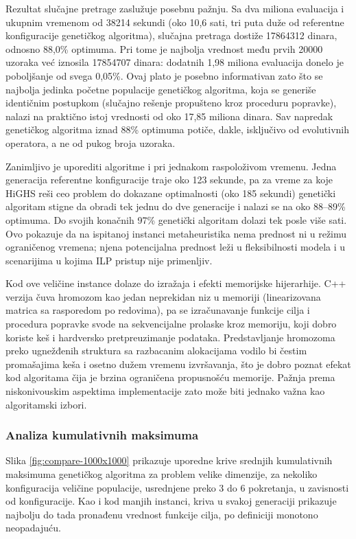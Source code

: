 \documentclass[12pt]{article}
\begin{document}
Rezultat slučajne pretrage zaslužuje posebnu pažnju. Sa dva miliona evaluacija i ukupnim vremenom od 38214 sekundi (oko 10,6 sati, tri puta duže od referentne konfiguracije genetičkog algoritma), slučajna pretraga dostiže 17864312 dinara, odnosno 88{,}0\% optimuma. Pri tome je najbolja vrednost među prvih 20000 uzoraka već iznosila 17854707 dinara: dodatnih 1,98 miliona evaluacija donelo je poboljšanje od svega 0,05\%. Ovaj plato je posebno informativan zato što se najbolja jedinka početne populacije genetičkog algoritma, koja se generiše identičnim postupkom (slučajno rešenje propušteno kroz proceduru popravke), nalazi na praktično istoj vrednosti od oko 17,85 miliona dinara. Sav napredak genetičkog algoritma iznad 88\% optimuma potiče, dakle, isključivo od evolutivnih operatora, a ne od pukog broja uzoraka.

Zanimljivo je uporediti algoritme i pri jednakom raspoloživom vremenu. Jedna generacija referentne konfiguracije traje oko 123 sekunde, pa za vreme za koje HiGHS reši ceo problem do dokazane optimalnosti (oko 185 sekundi) genetički algoritam stigne da obradi tek jednu do dve generacije i nalazi se na oko 88--89\% optimuma. Do svojih konačnih 97\% genetički algoritam dolazi tek posle više sati. Ovo pokazuje da na ispitanoj instanci metaheuristika nema prednost ni u režimu ograničenog vremena; njena potencijalna prednost leži u fleksibilnosti modela i u scenarijima u kojima ILP pristup nije primenljiv.

Kod ove veličine instance dolaze do izražaja i efekti memorijske hijerarhije. C++ verzija čuva hromozom kao jedan neprekidan niz u memoriji (linearizovana matrica sa rasporedom po redovima), pa se izračunavanje funkcije cilja i procedura popravke svode na sekvencijalne prolaske kroz memoriju, koji dobro koriste keš i hardversko pretpreuzimanje podataka. Predstavljanje hromozoma preko ugnežđenih struktura sa razbacanim alokacijama vodilo bi čestim promašajima keša i osetno dužem vremenu izvršavanja, što je dobro poznat efekat kod algoritama čija je brzina ograničena propusnošću memorije. Pažnja prema niskonivouskim aspektima implementacije zato može biti jednako važna kao algoritamski izbori.

\subsubsection{Analiza kumulativnih maksimuma}

Slika \ref{fig:compare-1000x1000} prikazuje uporedne krive srednjih kumulativnih maksimuma genetičkog algoritma za problem velike dimenzije, za nekoliko konfiguracija veličine populacije, usrednjene preko 3 do 6 pokretanja, u zavisnosti od konfiguracije. Kao i kod manjih instanci, kriva u svakoj generaciji prikazuje najbolju do tada pronađenu vrednost funkcije cilja, po definiciji monotono neopadajuću.
\end{document}
